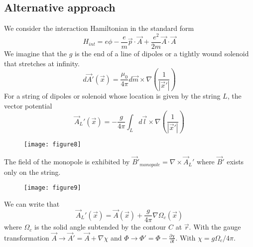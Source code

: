 \documentclass{article}
\begin{document}
	\subsection*{Alternative approach}
	We consider the interaction Hamiltonian in the standard form
	\begin{equation}
		H_{int} = e\phi - \frac{e}{m} \vec{p} \cdot \vec{A} + \frac{e^2}{2m} \vec{A} \cdot \vec{A}
	\end{equation}
	We imagine that the $g$ is the end of a line of dipoles or a tightly wound solenoid that stretches at infinity.
	\begin{equation}
		d\vec{A}'(\vec{x}) = \frac{\mu_0}{4\pi} d\vec{m} \times \nabla\left(\frac{1}{|\vec{x}'|}\right)
	\end{equation}
	For a string of dipoles or solenoid whose location is given by the string $L$, the vector potential
	\begin{equation}
		\vec{A}_L'(\vec{x}) = -\frac{g}{4\pi} \int_L d\vec{l} \times \nabla \left(\frac{1}{|\vec{x}'|}\right)
	\end{equation}
	
	\begin{figure}[h]
		\centering
		\texttt{[image: figure8]}
		\caption{}
		\label{fig:figure8}
	\end{figure}
	
	The field of the monopole is exhibited by $\vec{B}'_{monopole} = \nabla\times\vec{A}_L'$ where $\vec{B}'$ exists only on the string.
	
	\begin{figure}[h]
		\centering
		\texttt{[image: figure9]}
		\caption{}
		\label{fig:figure9}
	\end{figure}
	
	We can write that
	\begin{equation}
		\vec{A}_L'(\vec{x}) = \vec{A}(\vec{x}) + \frac{g}{4\pi} \nabla\Omega_c(\vec{x})
	\end{equation}
	where $\Omega_c$ is the solid angle subtended by the contour $C$ at $\vec{r}$.
	With the gauge transformation $\vec{A} \to \vec{A}' = \vec{A} + \nabla\chi$ and $\Phi \to \Phi' = \Phi - \frac{\partial\chi}{\partial t}$. With $\chi = g\Omega_c/4\pi$.
	
\end{document}
